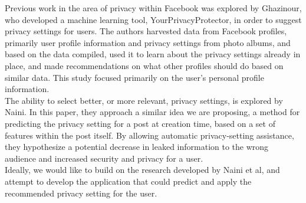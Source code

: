 \tab Previous work in the area of privacy within Facebook was explored by Ghazinour\cite{ghazinour2016yourprivacyprotector}, who developed a machine learning tool, YourPrivacyProtector, in order to suggest privacy settings for users. The authors harvested data from Facebook profiles, primarily user profile information and privacy settings from photo albums, and based on the data compiled, used it to learn about the privacy settings already in place, and made recommendations on what other profiles should do based on similar data. This study focused primarily on the user's personal profile information.
\\
\tab The ability to select better, or more relevant, privacy settings, is explored by Naini\cite{naini2015}. In this paper, they approach a similar idea we are proposing, a method for predicting the privacy setting for a post at creation time, based on a set of features within the post itself. By allowing automatic privacy-setting assistance, they hypothesize a potential decrease in leaked information to the wrong audience and increased security and privacy for a user.
\\
\tab Ideally, we would like to build on the research developed by Naini et al, and attempt to develop the application that could predict and apply the recommended privacy setting for the user. 
